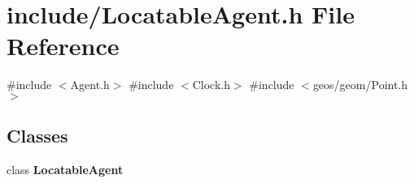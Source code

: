 \section{include/\+Locatable\+Agent.h File Reference}
\label{_locatable_agent_8h}
{\ttfamily \#include $<$Agent.\+h$>$}\newline
{\ttfamily \#include $<$Clock.\+h$>$}\newline
{\ttfamily \#include $<$geos/geom/\+Point.\+h$>$}\newline
\subsection*{Classes}
\begin{DoxyCompactItemize}
\item 
class \textbf{ Locatable\+Agent}
\end{DoxyCompactItemize}
